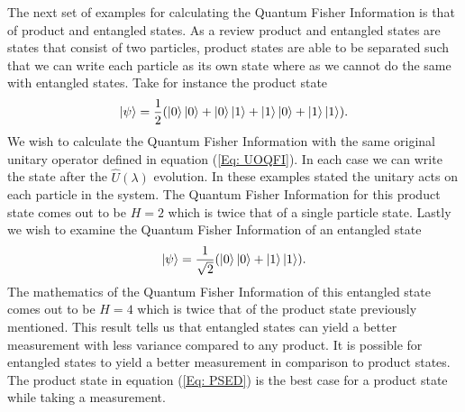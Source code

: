\documentclass[twocolumn]{article}
\begin{document}
The next set of examples for calculating the Quantum Fisher Information is that of product and entangled states. As a review product and entangled states are states that consist of two particles, product states are able to be separated such that we can write each particle as its own state where as we cannot do the same with entangled states. Take for instance the product state 
\begin{equation} \label{Eq: PSED}
\ket{\psi}=\frac{1}{2}(\ket{0}\ket{0}+\ket{0}\ket{1}+\ket{1}\ket{0}+\ket{1}\ket{1}).
\end{equation}
We wish to calculate the Quantum Fisher Information with the same original unitary operator defined in equation (\ref{Eq: UOQFI}). In each case we can write the state after the $\hat{U}(\lambda)$ evolution. In these examples stated the unitary acts on each particle in the system. The Quantum Fisher Information for this product state comes out to be $H=2$ which is twice that of a single particle state. Lastly we wish to examine the Quantum Fisher Information of an entangled state
\begin{equation} \label{Eq: QFIOES}
\ket{\psi}=\frac{1}{\sqrt{2}}(\ket{0}\ket{0}+\ket{1}\ket{1}).
\end{equation}
The mathematics of the Quantum Fisher Information of this entangled state comes out to be $H=4$ which is twice that of the product state previously mentioned. This result tells us that entangled states can yield a better measurement with less variance compared to any product. It is possible for entangled states to yield a better measurement in comparison to product states. The product state in equation (\ref{Eq: PSED}) is the best case for a product state while taking a measurement.
\end{document}
